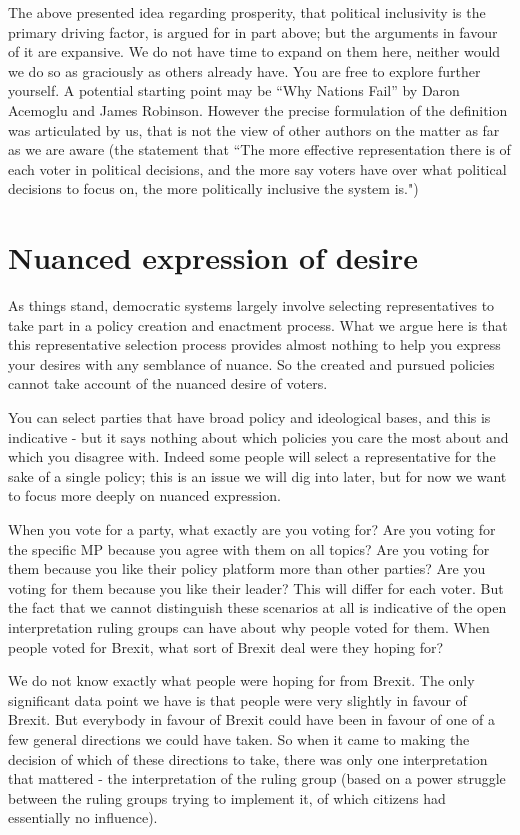 \documentclass[twoside]{article}
\begin{document}
The above presented idea regarding prosperity, that political inclusivity is the primary driving factor, is argued for in part above; but the arguments in favour of it are expansive. We do not have time to expand on them here, neither would we do so as graciously as others already have. You are free to explore further yourself. A potential starting point may be “Why Nations Fail” by Daron Acemoglu and James Robinson. However the precise formulation of the definition was articulated by us, that is not the view of other authors on the matter as far as we are aware (the statement that ``The more effective representation there is of each voter in political decisions, and the more say voters have over what political decisions to focus on, the more politically inclusive the system is.")

\section{Nuanced expression of desire}

As things stand, democratic systems largely involve selecting representatives to take part in a policy creation and enactment process. What we argue here is that this representative selection process provides almost nothing to help you express your desires with any semblance of nuance. So the created and pursued policies cannot take account of the nuanced desire of voters.

You can select parties that have broad policy and ideological bases, and this is indicative - but it says nothing about which policies you care the most about and which you disagree with. Indeed some people will select a representative for the sake of a single policy; this is an issue we will dig into later, but for now we want to focus more deeply on nuanced expression.

When you vote for a party, what exactly are you voting for? Are you voting for the specific MP because you agree with them on all topics? Are you voting for them because you like their policy platform more than other parties? Are you voting for them because you like their leader? This will differ for each voter. But the fact that we cannot distinguish these scenarios at all is indicative of the open interpretation ruling groups can have about why people voted for them. When people voted for Brexit, what sort of Brexit deal were they hoping for?

We do not know exactly what people were hoping for from Brexit. The only significant data point we have is that people were very slightly in favour of Brexit. But everybody in favour of Brexit could have been in favour of one of a few general directions we could have taken. So when it came to making the decision of which of these directions to take, there was only one interpretation that mattered - the interpretation of the ruling group (based on a power struggle between the ruling groups trying to implement it, of which citizens had essentially no influence).
\end{document}
